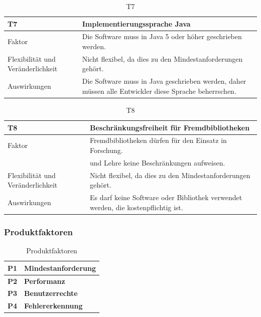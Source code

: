 \documentclass[fontsize=12pt,paper=a4,twoside]{scrartcl}
\begin{document}
\begin{table}[H]
\caption{T7}
\begin{tabular}{|p{3cm}|p{12cm}|}\hline
\textbf{T7} & \textbf{Implementierungssprache Java} \\ \hline \hline
Faktor & Die Software muss in Java 5 oder höher geschrieben werden.\\ \hline
Flexibilität und Veränderlichkeit & Nicht flexibel, da dies zu den Mindestanforderungen gehört.\\ \hline
Auswirkungen & Die Software muss in Java geschrieben werden, daher müssen alle Entwickler diese Sprache beherrschen. \\ \hline
\end{tabular}
\end{table}

\begin{table}[H]
\caption{T8}
\begin{tabular}{|p{3cm}|p{12cm}|}\hline
\textbf{T8} & \textbf{Beschränkungsfreiheit für Fremdbibliotheken}\\ \hline \hline
Faktor & Fremdbibliotheken dürfen für den Einsatz in Forschung.\\
& und Lehre keine Beschränkungen aufweisen. \\ \hline
Flexibilität und Veränderlichkeit & Nicht flexibel, da dies zu den Mindestanforderungen gehört.\\ \hline
Auswirkungen & Es darf keine Software oder Bibliothek verwendet werden, die kostenpflichtig ist. \\ \hline
\end{tabular}
\end{table}

\subsubsection{Produktfaktoren}
\label{sec:produktfaktoren}

\begin{table}[H]
\centering
\caption{Produktfaktoren}
\begin{tabular}{|l|l|} \hline
\textbf{P1} & \textbf{Mindestanforderung} \\ \hline
\textbf{P2} &  \textbf{Performanz}\\ \hline
\textbf{P3} &  \textbf{Benutzerrechte} \\ \hline
\textbf{P4} &  \textbf{Fehlererkennung} \\ \hline
\end{tabular}
\end{table}
\end{document}
